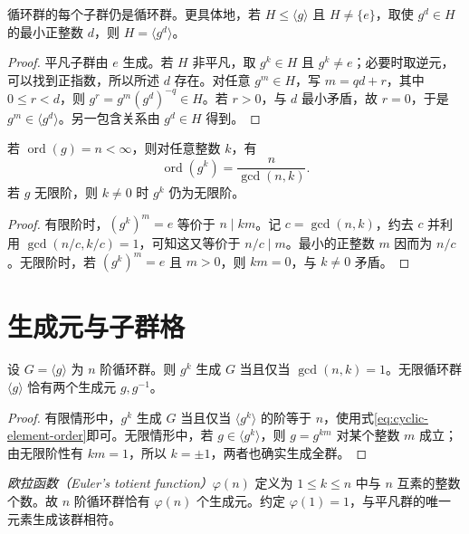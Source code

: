\begin{theorem}[循环群的子群]\label{thm:cyclic-subgroups}
循环群的每个子群仍是循环群。更具体地，若 $H\leq\langle g\rangle$ 且 $H\ne\{e\}$，取使 $g^d\in H$ 的最小正整数 $d$，则 $H=\langle g^d\rangle$。
\end{theorem}
\begin{proof}
平凡子群由 $e$ 生成。若 $H$ 非平凡，取 $g^k\in H$ 且 $g^k\ne e$；必要时取逆元，可以找到正指数，所以所述 $d$ 存在。对任意 $g^m\in H$，写 $m=qd+r$，其中 $0\leq r<d$，则 $g^r=g^m(g^d)^{-q}\in H$。若 $r>0$，与 $d$ 最小矛盾，故 $r=0$，于是 $g^m\in\langle g^d\rangle$。另一包含关系由 $g^d\in H$ 得到。
\end{proof}

\begin{proposition}[循环群中的元素阶]\label{prop:cyclic-element-order}
若 $\operatorname{ord}(g)=n<\infty$，则对任意整数 $k$，有
\begin{equation}\label{eq:cyclic-element-order}
  \operatorname{ord}(g^k)=\frac{n}{\gcd(n,k)}.
\end{equation}
若 $g$ 无限阶，则 $k\ne0$ 时 $g^k$ 仍为无限阶。
\end{proposition}
\begin{proof}
有限阶时，$(g^k)^m=e$ 等价于 $n\mid km$。记 $c=\gcd(n,k)$，约去 $c$ 并利用 $\gcd(n/c,k/c)=1$，可知这又等价于 $n/c\mid m$。最小的正整数 $m$ 因而为 $n/c$。无限阶时，若 $(g^k)^m=e$ 且 $m>0$，则 $km=0$，与 $k\ne0$ 矛盾。
\end{proof}

\section{生成元与子群格}\label{sec:cyclic-subgroup-lattice}

\begin{corollary}[生成元判别]\label{cor:cyclic-generators}
设 $G=\langle g\rangle$ 为 $n$ 阶循环群。则 $g^k$ 生成 $G$ 当且仅当 $\gcd(n,k)=1$。无限循环群 $\langle g\rangle$ 恰有两个生成元 $g,g^{-1}$。
\end{corollary}
\begin{proof}
有限情形中，$g^k$ 生成 $G$ 当且仅当 $\langle g^k\rangle$ 的阶等于 $n$，使用式\eqref{eq:cyclic-element-order}即可。无限情形中，若 $g\in\langle g^k\rangle$，则 $g=g^{km}$ 对某个整数 $m$ 成立；由无限阶性有 $km=1$，所以 $k=\pm1$，两者也确实生成全群。
\end{proof}

\emph{欧拉函数（Euler's totient function）}$\varphi(n)$ 定义为 $1\leq k\leq n$ 中与 $n$ 互素的整数个数。故 $n$ 阶循环群恰有 $\varphi(n)$ 个生成元。约定 $\varphi(1)=1$，与平凡群的唯一元素生成该群相符。

